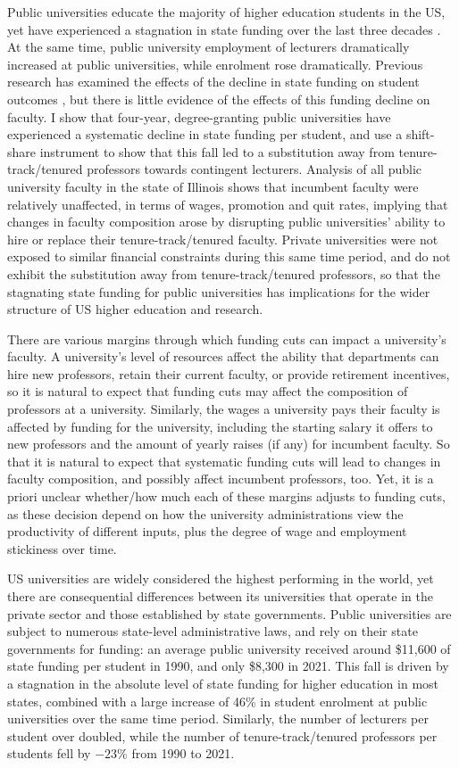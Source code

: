 Public universities educate the majority of higher education students in the US, yet have experienced a stagnation in state funding over the last three decades .
At the same time, public university employment of lecturers dramatically increased at public universities, while enrolment rose dramatically.
Previous research has examined the effects of the decline in state funding on student outcomes \citep{NBERw23736,NBERw27885}, but there is little evidence of the effects of this funding decline on faculty.
I show that four-year, degree-granting public universities have experienced a systematic decline in state funding per student, and use a shift-share instrument to show that this fall led to a substitution away from tenure-track/tenured professors towards contingent lecturers.
Analysis of all public university faculty in the state of Illinois shows that incumbent faculty were relatively unaffected, in terms of wages, promotion and quit rates, implying that changes in faculty composition arose by disrupting public universities' ability to hire or replace their tenure-track/tenured faculty. 
Private universities were not exposed to similar financial constraints during this same time period, and do not exhibit the substitution away from tenure-track/tenured professors, so that the stagnating state funding for public universities has implications for the wider structure of US higher education and research.

There are various margins through which funding cuts can impact a university's faculty.
A university's level of resources affect the ability that departments can hire new professors, retain their current faculty, or provide retirement incentives, so it is natural to expect that funding cuts may affect the composition of professors at a university.
Similarly, the wages a university pays their faculty is affected by funding for the university, including the starting salary it offers to new professors and the amount of yearly raises (if any) for incumbent faculty.
So that it is natural to expect that systematic funding cuts will lead to changes in faculty composition, and possibly affect incumbent professors, too.
Yet, it is a priori unclear whether/how much each of these margins adjusts to funding cuts, as these decision depend on how the university administrations view the productivity of different inputs, plus the degree of wage and employment stickiness over time.

US universities are widely considered the highest performing in the world, yet there are consequential differences between its universities that operate in the private sector and those established by state governments.
Public universities are subject to numerous state-level administrative laws, and rely on their state governments for funding: an average public university received around \$11,600 of state funding per student in 1990, and only \$8,300 in 2021.
This fall is driven by a stagnation in the absolute level of state funding for higher education in most states, combined with a large increase of 46\% in student enrolment at public universities over the same time period.
Similarly, the number of lecturers per student over doubled, while the number of tenure-track/tenured professors per students fell by $-23$\% from 1990 to 2021.

